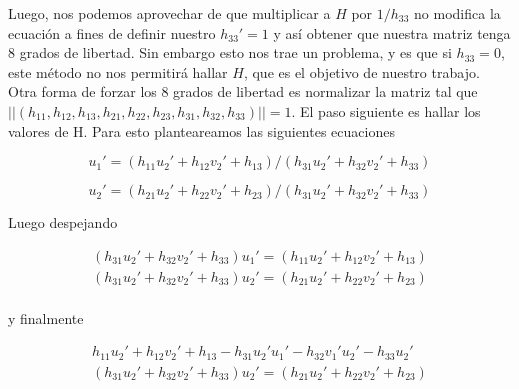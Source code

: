 \documentclass{article}
\begin{document}
Luego, nos podemos aprovechar de que multiplicar a $H$ por $1/h_{33}$ no modifica la ecuación a fines de definir nuestro $h_{33}' = 1$ y así obtener que nuestra matriz tenga 8 grados de libertad.
Sin embargo esto nos trae un problema, y es que si $h_{33} = 0$, este método no nos permitirá hallar $H$, que es el objetivo de nuestro trabajo. Otra forma de forzar los 8 grados de libertad es normalizar la matriz tal que $|| (h_{11},h_{12},h_{13},h_{21},h_{22},h_{23},h_{31},h_{32},h_{33} )|| = 1$.
El paso siguiente es hallar los valores de H. Para esto planteareamos las siguientes ecuaciones
\begin{figure}[]
    \centering
    \begin{equation}
        u_1' = (h_{11} u_2' + h_{12} v_2' + h_{13})/(h_{31} u_2' + h_{32} v_2' + h_{33})
    \end{equation}
    \label{fig:H-eq-1}
\end{figure}
\begin{figure}[]
    \centering
    \begin{equation}
        u_2' = (h_{21} u_2' + h_{22} v_2' + h_{23})/(h_{31} u_2' + h_{32} v_2' + h_{33})
    \end{equation}
    \label{fig:H-eq-1}
\end{figure}

Luego despejando 
\begin{figure}[h]
    \centering
    \begin{align}
        (h_{31} u_2' + h_{32} v_2' + h_{33})u_1' = (h_{11} u_2' + h_{12} v_2' + h_{13})\\
        (h_{31} u_2' + h_{32} v_2' + h_{33})u_2' = (h_{21} u_2' + h_{22} v_2' + h_{23})\\
    \end{align}
    \label{fig:H-eq-2}
\end{figure}
 y finalmente
\begin{figure}[h]
    \centering
    \begin{align}
       h_{11} u_2' + h_{12} v_2' + h_{13} - h_{31} u_2' u_1' - h_{32} v_1' u_2' - h_{33} u_2'\\
        (h_{31} u_2' + h_{32} v_2' + h_{33})u_2' = (h_{21} u_2' + h_{22} v_2' + h_{23})\\
    \end{align}
    \label{fig:H-eq-2}
\end{figure}
\end{document}
